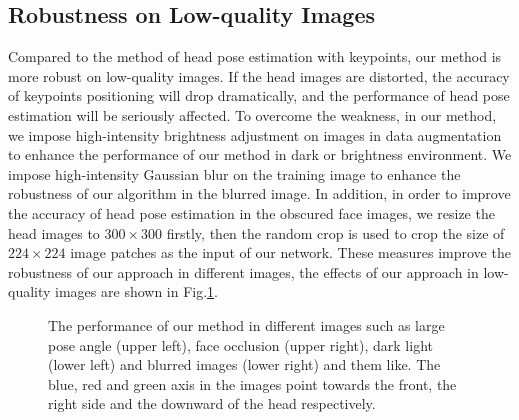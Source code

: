 \documentclass[english]{DDCLSconf}
\begin{document}
\subsection{Robustness on Low-quality Images}
Compared to the method of head pose estimation with keypoints, our method is more robust on low-quality images. If the head images are distorted, the accuracy of keypoints positioning will drop dramatically, and the performance of head pose estimation will be seriously affected. To overcome the weakness, in our method, we impose high-intensity brightness adjustment on images in data augmentation to enhance the performance of our method in dark or brightness environment. We impose high-intensity Gaussian blur on the training image to enhance the robustness of our algorithm in the blurred image. In addition, in order to improve the accuracy of head pose estimation in the obscured face images, we resize the head images to $300\times 300$ firstly, then the random crop is used to crop the size of $224\times 224$ image patches as the input of our network. These measures improve the robustness of our approach in different images, the effects of our approach in low-quality images are shown in Fig.\ref{result_in_different_envs}.

\begin{figure}[!htb]
	\centering
	\quad
	\caption{The performance of our method in different images such as large pose angle (upper left), face occlusion (upper right),  dark light (lower left) and blurred images (lower right) and them like. The blue, red and green axis in the images point towards the front, the right side and the downward of the head respectively.}
	\label{result_in_different_envs}
\end{figure}
\end{document}
